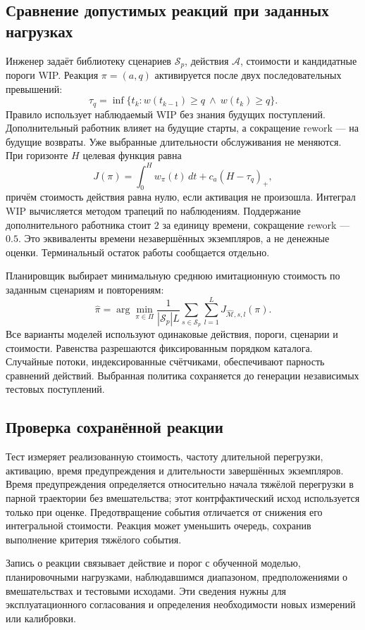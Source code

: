 \subsection{Сравнение допустимых реакций при заданных нагрузках}
Инженер задаёт библиотеку сценариев $\mathcal S_p$, действия $\mathcal A$, стоимости и кандидатные пороги WIP. Реакция $\pi=(a,q)$ активируется после двух последовательных превышений:
\begin{equation}\label{eq:trigger}
\tau_q=\inf\{t_k:w(t_{k-1})\geq q\ \land\ w(t_k)\geq q\}.
\end{equation}
Правило использует наблюдаемый WIP без знания будущих поступлений. Дополнительный работник влияет на будущие старты, а сокращение rework — на будущие возвраты. Уже выбранные длительности обслуживания не меняются. При горизонте $H$ целевая функция равна
\begin{equation}\label{eq:cost}
J(\pi)=\int_0^H w_\pi(t)\,dt+c_a(H-\tau_q)_+,
\end{equation}
причём стоимость действия равна нулю, если активация не произошла. Интеграл WIP вычисляется методом трапеций по наблюдениям. Поддержание дополнительного работника стоит $2$ за единицу времени, сокращение rework — $0.5$. Это эквиваленты времени незавершённых экземпляров, а не денежные оценки. Терминальный остаток работы сообщается отдельно.

Планировщик выбирает минимальную среднюю имитационную стоимость по заданным сценариям и повторениям:
\begin{equation}\label{eq:policy}
\widehat\pi=\arg\min_{\pi\in\Pi}\frac{1}{|\mathcal S_p|L}
\sum_{s\in\mathcal S_p}\sum_{l=1}^{L}J_{\widehat{\mathcal M},s,l}(\pi).
\end{equation}
Все варианты моделей используют одинаковые действия, пороги, сценарии и стоимости. Равенства разрешаются фиксированным порядком каталога. Случайные потоки, индексированные счётчиками, обеспечивают парность сравнений действий. Выбранная политика сохраняется до генерации независимых тестовых поступлений.

\subsection{Проверка сохранённой реакции}
Тест измеряет реализованную стоимость, частоту длительной перегрузки, активацию, время предупреждения и длительности завершённых экземпляров. Время предупреждения определяется относительно начала тяжёлой перегрузки в парной траектории без вмешательства; этот контрфактический исход используется только при оценке. Предотвращение события отличается от снижения его интегральной стоимости. Реакция может уменьшить очередь, сохранив выполнение критерия тяжёлого события.

Запись о реакции связывает действие и порог с обученной моделью, планировочными нагрузками, наблюдавшимся диапазоном, предположениями о вмешательствах и тестовыми исходами. Эти сведения нужны для эксплуатационного согласования и определения необходимости новых измерений или калибровки.
